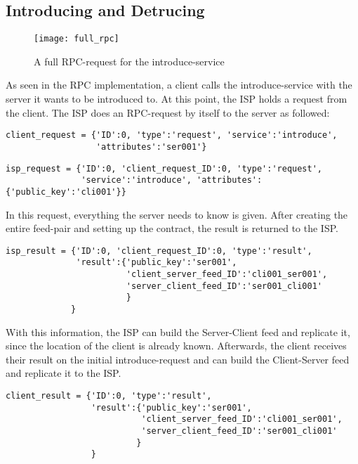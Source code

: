 \subsection{Introducing and Detrucing}
\begin{figure}
    \centering
    \texttt{[image: full\_rpc]}
    \caption{A full RPC-request for the introduce-service}
    \label{fig:fullprc}
\end{figure}

As seen in the RPC implementation, a client calls the introduce-service with the server it wants to be introduced to. At this point, the ISP holds a request from the client. The ISP does an RPC-request by itself to the server as followed:
\\
\begin{python}
    
\begin{lstlisting}
client_request = {'ID':0, 'type':'request', 'service':'introduce', 
                  'attributes':'ser001'}
\end{lstlisting}
\begin{lstlisting}
isp_request = {'ID':0, 'client_request_ID':0, 'type':'request', 
               'service':'introduce', 'attributes':{'public_key':'cli001'}}
\end{lstlisting}
\end{python}


In this request, everything the server needs to know is given. After creating the entire feed-pair and setting up the contract, the result is returned to the ISP.
\\
\begin{python}
    
\begin{lstlisting}
isp_result = {'ID':0, 'client_request_ID':0, 'type':'result', 
              'result':{'public_key':'ser001', 
                        'client_server_feed_ID':'cli001_ser001',
                        'server_client_feed_ID':'ser001_cli001'
                        }
             }
\end{lstlisting}
\end{python}

With this information, the ISP can build the Server-Client feed and replicate it, since the location of the client is already known.
Afterwards, the client receives their result on the initial introduce-request and can build the Client-Server feed and replicate it to the ISP.\\
\begin{python}
    
\begin{lstlisting}
client_result = {'ID':0, 'type':'result', 
                 'result':{'public_key':'ser001', 
                           'client_server_feed_ID':'cli001_ser001', 
                           'server_client_feed_ID':'ser001_cli001'
                          }
                 }
\end{lstlisting}
\end{python}

